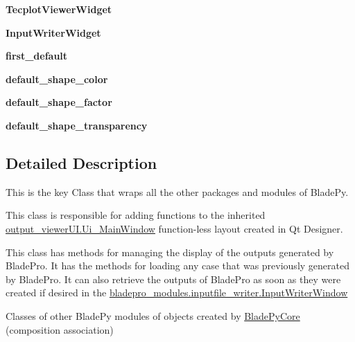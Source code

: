 \begin{DoxyCompactItemize}
{\bfseries Tecplot\+Viewer\+Widget}
\item 
\hypertarget{a00079_a4ead2c1cc874da56fad290cca0630fc0}{}\label{a00079_a4ead2c1cc874da56fad290cca0630fc0} 
{\bfseries Input\+Writer\+Widget}
\item 
\hypertarget{a00079_af0ce94ff8ed058ada4057b3062de1d0d}{}\label{a00079_af0ce94ff8ed058ada4057b3062de1d0d} 
{\bfseries first\+\_\+default}
\item 
\hypertarget{a00079_a74bd4997b68dd3f273e5eb6cbbbac70a}{}\label{a00079_a74bd4997b68dd3f273e5eb6cbbbac70a} 
{\bfseries default\+\_\+shape\+\_\+color}
\item 
\hypertarget{a00079_aafff31611ea2a5eb584f2550607e3e23}{}\label{a00079_aafff31611ea2a5eb584f2550607e3e23} 
{\bfseries default\+\_\+shape\+\_\+factor}
\item 
\hypertarget{a00079_a26accbeb5266ec3f792c86cf8643f696}{}\label{a00079_a26accbeb5266ec3f792c86cf8643f696} 
{\bfseries default\+\_\+shape\+\_\+transparency}
\end{DoxyCompactItemize}


\subsection{Detailed Description}
This is the key Class that wraps all the other packages and modules of Blade\+Py. 

This class is responsible for adding functions to the inherited \hyperlink{a00099}{output\+\_\+viewer\+U\+I.\+Ui\+\_\+\+Main\+Window} function-\/less layout created in Qt Designer.

This class has methods for managing the display of the outputs generated by Blade\+Pro. It has the methods for loading any case that was previously generated by Blade\+Pro. It can also retrieve the outputs of Blade\+Pro as soon as they were created if desired in the \hyperlink{a00071}{bladepro\+\_\+modules.\+inputfile\+\_\+writer.\+Input\+Writer\+Window}

Classes of other Blade\+Py modules of objects created by \hyperlink{a00079}{Blade\+Py\+Core} (composition association)

